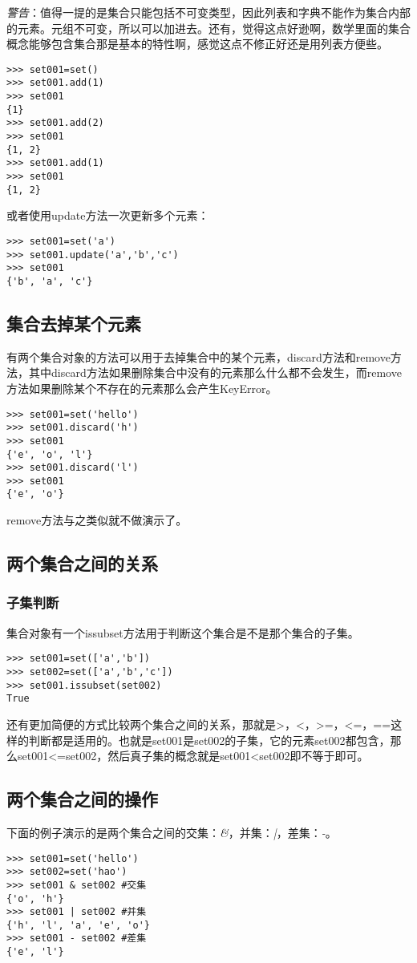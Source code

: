 \documentclass[12pt,oneside]{book}
\begin{document}
\begin{common-format}
\emph{警告}：值得一提的是集合只能包括不可变类型，因此列表和字典不能作为集合内部的元素。元组不可变，所以可以加进去。还有，觉得这点好逊啊，数学里面的集合概念能够包含集合那是基本的特性啊，感觉这点不修正好还是用列表方便些。

\begin{Verbatim}
>>> set001=set()
>>> set001.add(1)
>>> set001
{1}
>>> set001.add(2)
>>> set001
{1, 2}
>>> set001.add(1)
>>> set001
{1, 2}
\end{Verbatim}

或者使用update方法一次更新多个元素：
\begin{Verbatim}
>>> set001=set('a')
>>> set001.update('a','b','c')
>>> set001
{'b', 'a', 'c'}
\end{Verbatim}


\subsection{集合去掉某个元素}
有两个集合对象的方法可以用于去掉集合中的某个元素，discard方法和remove方法，其中discard方法如果删除集合中没有的元素那么什么都不会发生，而remove方法如果删除某个不存在的元素那么会产生KeyError。

\begin{Verbatim}
>>> set001=set('hello')
>>> set001.discard('h')
>>> set001
{'e', 'o', 'l'}
>>> set001.discard('l')
>>> set001
{'e', 'o'}
\end{Verbatim}

remove方法与之类似就不做演示了。

\subsection{两个集合之间的关系}

\subsubsection{子集判断}
集合对象有一个issubset方法用于判断这个集合是不是那个集合的子集。
\begin{Verbatim}
>>> set001=set(['a','b'])
>>> set002=set(['a','b','c'])
>>> set001.issubset(set002)
True
\end{Verbatim}

还有更加简便的方式比较两个集合之间的关系，那就是>，<，>=，<=，==这样的判断都是适用的。也就是set001是set002的子集，它的元素set002都包含，那么set001<=set002，然后真子集的概念就是set001<set002即不等于即可。


\subsection{两个集合之间的操作}
下面的例子演示的是两个集合之间的交集：\emph{\&{}}，并集：\emph{|}，差集：\emph{-}。
\begin{Verbatim}
>>> set001=set('hello')
>>> set002=set('hao')
>>> set001 & set002 #交集
{'o', 'h'}
>>> set001 | set002 #并集
{'h', 'l', 'a', 'e', 'o'}
>>> set001 - set002 #差集
{'e', 'l'}
\end{Verbatim}



\end{common-format}
\end{document}
